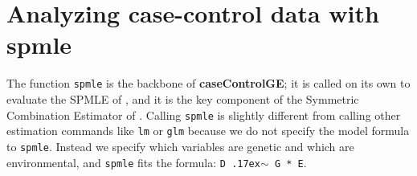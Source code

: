 \documentclass{article}\usepackage[]{graphicx}\usepackage[]{color}
\def\code#1{\texttt{#1}}
\def\pkg#1{\textbf{#1}}
\begin{document}
\section{Analyzing case-control data with spmle} \label{sec:spmle}

The function \code{spmle} is the backbone of \pkg{caseControlGE}; it is called on its own to evaluate the SPMLE of \citeauthor{Stalder2017}, and it is the key component of the Symmetric Combination Estimator of \citeauthor{Wang2018unpublished}.  Calling \code{spmle} is slightly different from calling other estimation commands like \code{lm} or \code{glm} because we do not specify the model formula to \code{spmle}.  Instead we specify which variables are genetic and which are environmental, and \code{spmle} fits the formula: \code{D {\raise.17ex\hbox{$\scriptstyle\sim$}} G * E}.
\end{document}
